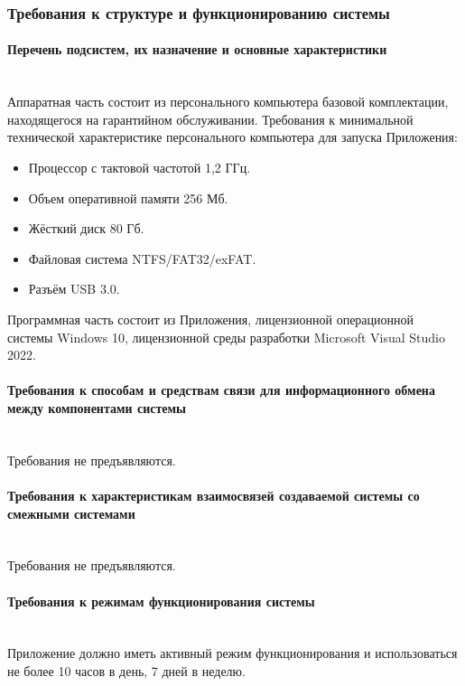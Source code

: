 \documentclass[12pt,a4paper]{article}
\begin{document}
\subsubsection{Требования к структуре и функционированию системы}
\paragraph{Перечень подсистем, их назначение и основные характеристики} \label{system}\mbox{}\medskip\\
\noindent Аппаратная часть состоит из персонального компьютера базовой комплектации, находящегося на гарантийном 
обслуживании. Требования к минимальной технической характеристике персонального компьютера для запуска Приложения:
\begin{itemize}
    \item Процессор с тактовой частотой 1,2 ГГц.
    \item Объем оперативной памяти 256 Мб.
    \item Жёсткий диск 80 Гб.
    \item Файловая система NTFS/FAT32/exFAT.
    \item Разъём USB 3.0.
\end{itemize}

\noindent Программная часть состоит из Приложения, лицензионной операционной системы \linebreak Windows 10, 
лицензионной среды разработки Microsoft Visual Studio 2022.

\paragraph{Требования к способам и средствам связи для информационного обмена между компонентами системы} \mbox{}\medskip\\
Требования не предъявляются.

\paragraph{Требования к характеристикам взаимосвязей создаваемой системы со смежными системами} \mbox{}\medskip\\
Требования не предъявляются.

\paragraph{Требования к режимам функционирования системы}\mbox{}\medskip\\
Приложение должно иметь активный режим функционирования и использоваться не более 10 часов в день, 7 дней в неделю.
\end{document}
